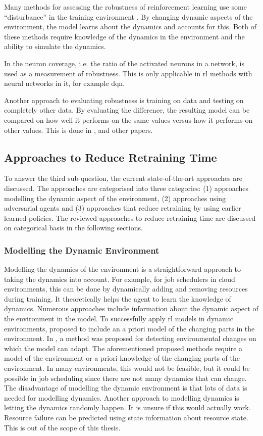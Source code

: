 Many methods for assessing the robustness of reinforcement learning use some
``disturbance'' in the training environment \cite{morimoto2005}. By
changing dynamic aspects of the environment, the model learns about the
dynamics and accounts for this. Both of these methods require knowledge of the
dynamics in the environment and the ability to simulate the dynamics.

In  the neuron coverage, i.e. the ratio of the activated
neurons in a network, is used as a measurement of robustness. This is only
applicable in \gls{rl} methods with neural networks in it, for example
\gls{dqn}.

Another approach to evaluating robustness is training on data and
testing on completely other data. By evaluating the difference, the resulting
model can be compared on how well it performs on the same values versus how it
performs on other values. This is done in , and other papers.


\subsection{Approaches to Reduce Retraining Time}\label{sec:reduce}

To answer the third sub-question, the current state-of-the-art approaches are
discussed. The approaches are categorised into three categories: (1) approaches
modelling the dynamic aspect of the environment, (2) approaches using
adversarial agents and (3) approaches that reduce retraining by using earlier
learned policies. The reviewed approaches to reduce retraining time are
discussed on categorical basis in the following sections.


\subsubsection{Modelling the Dynamic Environment}\label{sec:model}

Modelling the dynamics of the environment is a straightforward approach to
taking the dynamics into account. For example, for job schedulers in cloud
environments, this can be done by dynamically adding and removing resources
during training. It theoretically helps the agent to learn the knowledge of
dynamics. Numerous approaches include information about the dynamic aspect of
the environment in the model. To successfully apply \gls{rl} models in dynamic
environments,  proposed to include an a priori model of the
changing parts in the environment. In , a method was
proposed for detecting environmental changes on which the model can adapt. The
aforementioned proposed methods require a model of the environment or a priori
knowledge of the changing parts of the environment. In many environments, this
would not be feasible, but it could be possible in job scheduling since there
are not many dynamics that can change. The disadvantage of modelling the
dynamic environment is that lots of data is needed for modelling dynamics.
Another approach to modelling dynamics is letting the dynamics randomly
happen. It is unsure if this would actually work. Resource failure can be
predicted using state information about resource state. This is out of the
scope of this thesis.



